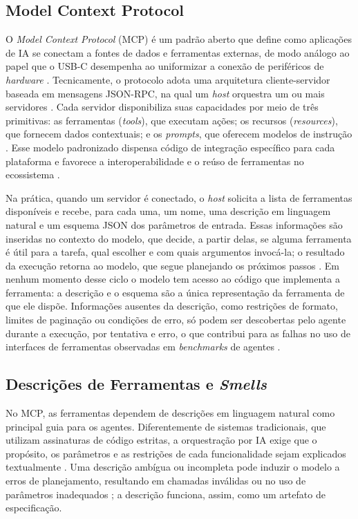 \subsection{Model Context Protocol}
\label{subsec:mcp}

O \textit{Model Context Protocol} (MCP) é um padrão aberto que define como aplicações de IA se conectam a fontes de dados e ferramentas externas, de modo análogo ao papel que o USB-C desempenha ao uniformizar a conexão de periféricos de \textit{hardware} \cite{guo2025measurement}. Tecnicamente, o protocolo adota uma arquitetura cliente-servidor baseada em mensagens JSON-RPC, na qual um \textit{host} orquestra um ou mais servidores \cite{shi2026description}. Cada servidor disponibiliza suas capacidades por meio de três primitivas: as ferramentas (\textit{tools}), que executam ações; os recursos (\textit{resources}), que fornecem dados contextuais; e os \textit{prompts}, que oferecem modelos de instrução \cite{guo2025measurement}. Esse modelo padronizado dispensa código de integração específico para cada plataforma e favorece a interoperabilidade e o reúso de ferramentas no ecossistema \cite{mcpAtFirstGlance}.

Na prática, quando um servidor é conectado, o \textit{host} solicita a lista de ferramentas disponíveis e recebe, para cada uma, um nome, uma descrição em linguagem natural e um esquema JSON dos parâmetros de entrada. Essas informações são inseridas no contexto do modelo, que decide, a partir delas, se alguma ferramenta é útil para a tarefa, qual escolher e com quais argumentos invocá-la; o resultado da execução retorna ao modelo, que segue planejando os próximos passos \cite{shi2026description}. Em nenhum momento desse ciclo o modelo tem acesso ao código que implementa a ferramenta: a descrição e o esquema são a única representação da ferramenta de que ele dispõe. Informações ausentes da descrição, como restrições de formato, limites de paginação ou condições de erro, só podem ser descobertas pelo agente durante a execução, por tentativa e erro, o que contribui para as falhas no uso de interfaces de ferramentas observadas em \textit{benchmarks} de agentes \cite{2025arXiv250814704L}.

\subsection{Descrições de Ferramentas e \textit{Smells}}
\label{subsec:smells}

No MCP, as ferramentas dependem de descrições em linguagem natural como principal guia para os agentes. Diferentemente de sistemas tradicionais, que utilizam assinaturas de código estritas, a orquestração por IA exige que o propósito, os parâmetros e as restrições de cada funcionalidade sejam explicados textualmente \cite{2026arXiv260214878M}. Uma descrição ambígua ou incompleta pode induzir o modelo a erros de planejamento, resultando em chamadas inválidas ou no uso de parâmetros inadequados \cite{shi2026description}; a descrição funciona, assim, como um artefato de especificação.

